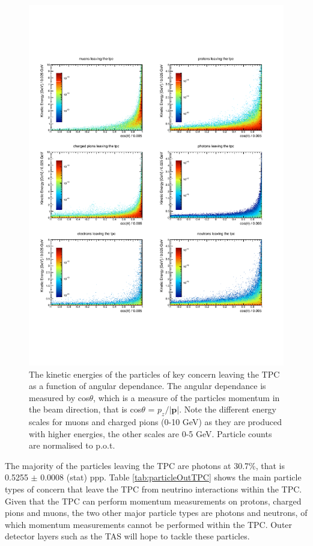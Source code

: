 \begin{figure}[htbp]
\begin{center}
  	\includegraphics[width=150mm]{Chapter4/figures/particleOut_energyVsCosTheta.pdf}
	\caption{The kinetic energies of the particles of key concern leaving the TPC as a function of angular dependance. The angular dependance is measured by cos$\theta$, which is a measure of the particles momentum in the beam direction, that is cos$\theta$ = $p_{z}/|\boldsymbol{p}|$. Note the different energy scales for muons and charged pions (0-10 GeV) as they are produced with higher energies, the other scales are 0-5 GeV. Particle counts are normalised to p.o.t.}
	\label{fig:particleFluxOutTPC}
\end{center}
\end{figure}

The majority of the particles leaving the TPC are photons at 30.7\%, that is 0.5255 $\pm$ 0.0008 (stat) ppp. Table \ref{tab:particleOutTPC} shows the main particle types of concern that leave the TPC from neutrino interactions within the TPC. Given that the TPC can perform momentum measurements on protons, charged pions and muons, the two other major particle types are photons and neutrons, of which momentum measurements cannot be performed within the TPC. Outer detector layers such as the TAS will hope to tackle these particles.

